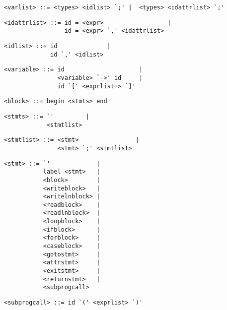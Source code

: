\begin{footnotesize}
\begin{lstlisting}[frame=single, label={varlist}, language=pie]
<varlist> ::= <types> <idlist> `;' |  <types> <idattrlist> `;'
\end{lstlisting}

\begin{lstlisting}[frame=single, label={idlist}, language=pie]
<idattrlist> ::= id = <expr>                  | 
                 id = <expr> `,' <idattrlist> 
\end{lstlisting}

\begin{lstlisting}[frame=single, label={idlist}, language=pie]
<idlist> ::= id              | 
             id `,' <idlist> 
\end{lstlisting}

\begin{lstlisting}[frame=single, label={variable}, language=pie]
<variable> ::= id                     | 
               <variable> `->' id     |
               id `[' <exprlist+> `]'
\end{lstlisting}

\begin{lstlisting}[frame=single]
<block> ::= begin <stmts> end
\end{lstlisting}

\begin{lstlisting}[frame=single]
<stmts> ::= `'         | 
            <stmtlist>
\end{lstlisting}

\begin{lstlisting}[frame=single]
<stmtlist> ::= <stmt>                | 
               <stmt> `;' <stmtlist>
\end{lstlisting}

\begin{lstlisting}[frame=single]
<stmt> ::= `'             | 
           label <stmt>   |
           <block>        |
           <writeblock>   |
           <writelnblock> |
           <readblock>    |
           <readlnblock>  |
           <loopblock>    |
           <ifblock>      |
           <forblock>     |
           <caseblock>    |
           <gotostmt>     |
           <attrstmt>     |
           <exitstmt>     |
           <returnstmt>   |
           <subprogcall>
\end{lstlisting}

\begin{lstlisting}[frame=single]
<subprogcall> ::= id `(' <exprlist> `)'
\end{lstlisting}


\end{footnotesize}
